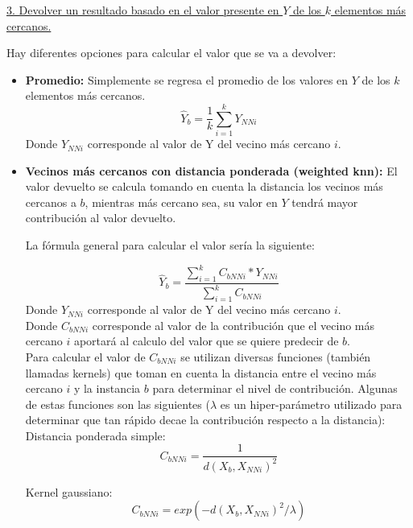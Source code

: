 \documentclass[11pt,fleqn]{book} %
\begin{document}
\underline{3. Devolver un resultado basado en el valor presente en $Y$ de los $k$ elementos más cercanos.}

Hay diferentes opciones para calcular el valor que se va a devolver:

\begin{itemize}
\item \textbf{Promedio: } Simplemente se regresa el promedio de los valores en $Y$ de los $k$ elementos más cercanos.
\begin{equation}
\hat{Y}_b = \frac{1}{k} \sum_{i=1}^{k} Y_{NNi}
\end{equation}
Donde $Y_{NNi}$ corresponde al valor de Y del vecino más cercano $i$.\\

\item \textbf{Vecinos más cercanos con distancia ponderada (weighted knn):} El valor devuelto se calcula tomando en cuenta la distancia los vecinos más cercanos a $b$, mientras más cercano sea, su valor en $Y$ tendrá mayor contribución al valor devuelto.

La fórmula general para calcular el valor sería la siguiente:

\begin{equation}
\hat{Y}_b=\frac{\sum_{i=1}^{k} C_{bNNi}*Y_{NNi}}{\sum_{i=1}^{k} C_{bNNi}} 
\end{equation}
Donde $Y_{NNi}$ corresponde al valor de Y del vecino más cercano $i$.\\
Donde $C_{bNNi}$ corresponde al valor de la contribución que el vecino más cercano $i$ aportará al calculo del valor que se quiere predecir de $b$.\\

Para calcular el valor de $C_{bNNi}$ se utilizan diversas funciones (también llamadas kernels) que toman en cuenta la distancia entre el vecino más cercano $i$ y la instancia $b$ para determinar el nivel de contribución. Algunas de estas funciones son las siguientes ($\lambda$ es un hiper-parámetro utilizado para determinar que tan rápido decae la contribución respecto a la distancia):\\

Distancia ponderada simple:
\begin{equation}
C_{bNNi}=\frac{1}{d(X_b,X_{NNi})^2} 
\end{equation}

Kernel gaussiano:
\begin{equation}
C_{bNNi}=exp( -d(X_b,X_{NNi})^2 / \lambda)
\end{equation}


\end{itemize}
\end{document}
